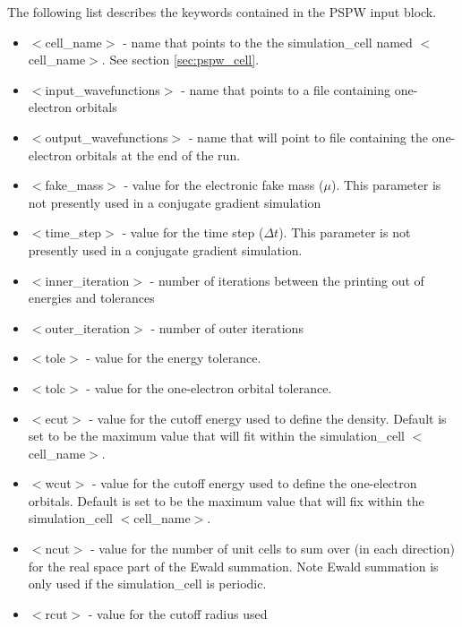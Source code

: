 The following list describes the keywords contained in the PSPW input block.
\begin{itemize}
        \item $<$cell\_name$>$ - name that points to the
              the simulation\_cell named $<$cell\_name$>$.  See section \ref{sec:pspw_cell}.
        \item $<$input\_wavefunctions$>$ - name that points
              to a file containing one-electron orbitals
        \item $<$output\_wavefunctions$>$ - name that will
              point to file containing the one-electron orbitals at the
              end of the run. 
        \item $<$fake\_mass$>$ - value for the electronic
              fake mass ($\mu$). This parameter is not presently used in a 
              conjugate gradient simulation
        \item $<$time\_step$>$ - value for the time step ($\Delta t$).  This
              parameter is not presently used in a conjugate gradient simulation.
        \item $<$inner\_iteration$>$ - number of iterations between the 
              printing out of energies and tolerances
        \item $<$outer\_iteration$>$ - number of outer iterations
        \item $<$tole$>$ - value for the energy tolerance.
        \item $<$tolc$>$ - value for the one-electron orbital tolerance.
        \item $<$ecut$>$ - value for the cutoff energy used
                           to define the density. Default is set
                           to be the maximum value that will fit
                           within the simulation\_cell $<$cell\_name$>$.
        \item $<$wcut$>$ - value for the cutoff energy used
                           to define the one-electron orbitals.
                           Default is set to be the maximum value that 
                           will fix within the simulation\_cell $<$cell\_name$>$.
        \item $<$ncut$>$ - value for the number of unit cells
                          to sum over (in each direction) for the real space
                          part of the Ewald summation. Note Ewald summation
                          is only used if the simulation\_cell is periodic.
        \item $<$rcut$>$ - value for the cutoff radius used

\end{itemize}
